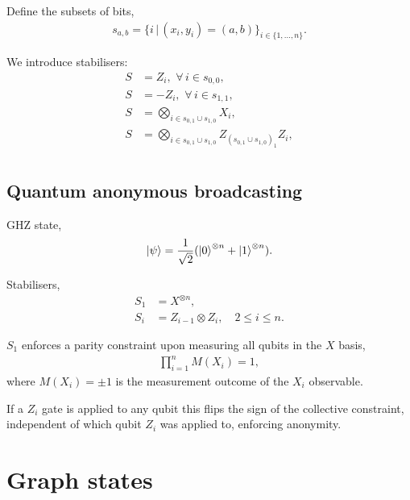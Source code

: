 \documentclass[twocolumn, aps, amsmath, amssymb, nofootinbib, superscriptaddress, longbibliography, doublefloatfix, table-of-contents, eqsecnum, rmp]{revtex4-2}
\begin{document}
Define the subsets of bits,
\begin{align}
	s_{a,b} = \{i\,|\,(x_i,y_i)=(a,b)\}_{i\in\{1,\dots,n\}}.
\end{align}

We introduce stabilisers:
\begin{align}
	S &= Z_i, \,\,\forall\, i\in s_{0,0}, \nonumber\\
	S &= -Z_i, \,\,\forall\, i\in s_{1,1}, \nonumber\\
	S &= \bigotimes_{i\in s_{0,1}\cup s_{1,0}} X_i, \nonumber\\
	S &= \bigotimes_{i\in s_{0,1}\cup s_{1,0}} Z_{(s_{0,1}\cup s_{1,0})_1} Z_i, \nonumber\\
\end{align}

%
%
%
%

\subsection{Quantum anonymous broadcasting}

GHZ state,
\begin{align}
	\ket\psi = \frac{1}{\sqrt{2}}(\ket{0}^{\otimes n} + \ket{1}^{\otimes n}).	
\end{align}

Stabilisers,
\begin{align}
	S_1 &= X^{\otimes n}, \nonumber\\
	S_i &= Z_{i-1}\otimes Z_{i}, \quad 2\leq i\leq n.
\end{align}

$S_1$ enforces a parity constraint upon measuring all qubits in the $X$ basis,
\begin{align}
	\prod_{i=1}^n M(X_i) = 1,
\end{align}
where $M(X_i)=\pm 1$ is the measurement outcome of the $X_i$ observable.

If a $Z_i$ gate is applied to any qubit this flips the sign of the collective constraint, independent of which qubit $Z_i$ was applied to, enforcing anonymity.

\section{Graph states}
\end{document}
